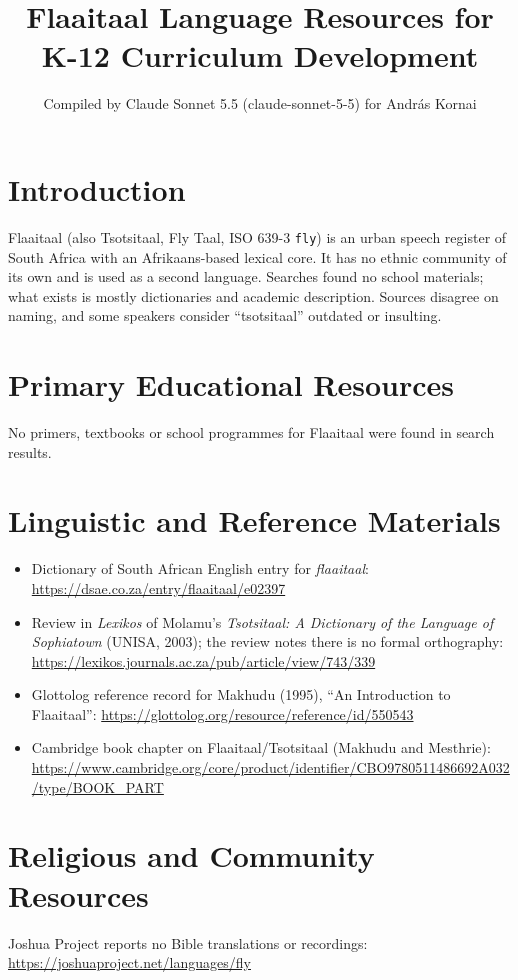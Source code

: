 \documentclass[12pt]{article}
\title{Flaaitaal Language Resources for K-12 Curriculum Development}
\author{Compiled by Claude Sonnet 5.5 (claude-sonnet-5-5) for Andr\'as Kornai}
\date{}
\begin{document}
\maketitle

\section{Introduction}
Flaaitaal (also Tsotsitaal, Fly Taal, ISO 639-3 \texttt{fly}) is an urban speech register of South Africa with an Afrikaans-based lexical core. It has no ethnic community of its own and is used as a second language. Searches found no school materials; what exists is mostly dictionaries and academic description. Sources disagree on naming, and some speakers consider ``tsotsitaal'' outdated or insulting.

\section{Primary Educational Resources}
No primers, textbooks or school programmes for Flaaitaal were found in search results.

\section{Linguistic and Reference Materials}
\begin{itemize}
\item Dictionary of South African English entry for \emph{flaaitaal}: \url{https://dsae.co.za/entry/flaaitaal/e02397}
\item Review in \emph{Lexikos} of Molamu's \emph{Tsotsitaal: A Dictionary of the Language of Sophiatown} (UNISA, 2003); the review notes there is no formal orthography: \url{https://lexikos.journals.ac.za/pub/article/view/743/339}
\item Glottolog reference record for Makhudu (1995), ``An Introduction to Flaaitaal'': \url{https://glottolog.org/resource/reference/id/550543}
\item Cambridge book chapter on Flaaitaal/Tsotsitaal (Makhudu and Mesthrie): \url{https://www.cambridge.org/core/product/identifier/CBO9780511486692A032/type/BOOK_PART}
\end{itemize}

\section{Religious and Community Resources}
Joshua Project reports no Bible translations or recordings: \url{https://joshuaproject.net/languages/fly}
\end{document}
